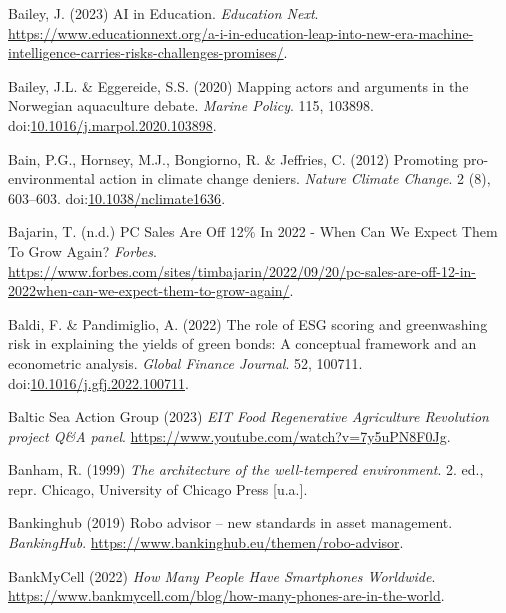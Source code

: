 \documentclass[
  letterpaper,
  DIV=11,
  numbers=noendperiod]{scrartcl}
\newlength{\cslhangindent}
\newenvironment{CSLReferences}[2] %
 {\begin{list}{}{%
  \setlength{\itemindent}{0pt}
  \setlength{\leftmargin}{0pt}
  \setlength{\parsep}{0pt}
  \ifodd #1
   \setlength{\leftmargin}{\cslhangindent}
   \setlength{\itemindent}{-1\cslhangindent}
  \fi
  \setlength{\itemsep}{#2\baselineskip}}}
 {\end{list}}
\begin{document}
\begin{CSLReferences}{0}{1}
Bailey, J. (2023) {AI} in {Education}. \emph{Education Next}.
\url{https://www.educationnext.org/a-i-in-education-leap-into-new-era-machine-intelligence-carries-risks-challenges-promises/}.

Bailey, J.L. \& Eggereide, S.S. (2020) Mapping actors and arguments in
the {Norwegian} aquaculture debate. \emph{Marine Policy}. 115, 103898.
doi:\href{https://doi.org/10.1016/j.marpol.2020.103898}{10.1016/j.marpol.2020.103898}.

Bain, P.G., Hornsey, M.J., Bongiorno, R. \& Jeffries, C. (2012)
Promoting pro-environmental action in climate change deniers.
\emph{Nature Climate Change}. 2 (8), 603--603.
doi:\href{https://doi.org/10.1038/nclimate1636}{10.1038/nclimate1636}.

Bajarin, T. (n.d.) {PC Sales Are Off} 12\% {In} 2022 - {When Can We
Expect Them To Grow Again}? \emph{Forbes}.
\url{https://www.forbes.com/sites/timbajarin/2022/09/20/pc-sales-are-off-12-in-2022when-can-we-expect-them-to-grow-again/}.

Baldi, F. \& Pandimiglio, A. (2022) The role of {ESG} scoring and
greenwashing risk in explaining the yields of green bonds: {A}
conceptual framework and an econometric analysis. \emph{Global Finance
Journal}. 52, 100711.
doi:\href{https://doi.org/10.1016/j.gfj.2022.100711}{10.1016/j.gfj.2022.100711}.

Baltic Sea Action Group (2023) \emph{{EIT Food Regenerative Agriculture
Revolution} project {Q}\&{A} panel}.
\url{https://www.youtube.com/watch?v=7y5uPN8F0Jg}.

Banham, R. (1999) \emph{The architecture of the well-tempered
environment}. 2. ed., repr. Chicago, University of Chicago Press
{[}u.a.{]}.

Bankinghub (2019) Robo advisor -- new standards in asset management.
\emph{BankingHub}. \url{https://www.bankinghub.eu/themen/robo-advisor}.

BankMyCell (2022) \emph{How {Many People Have Smartphones Worldwide}}.
\url{https://www.bankmycell.com/blog/how-many-phones-are-in-the-world}.


\end{CSLReferences}
\end{document}
